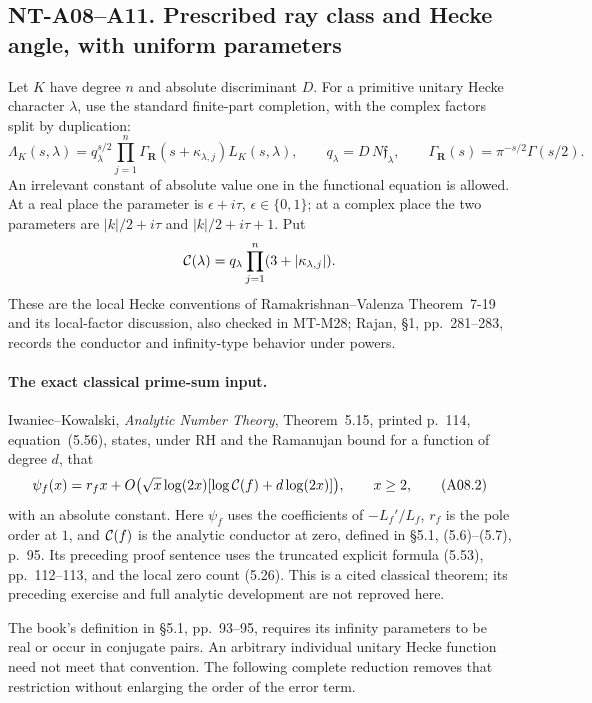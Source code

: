 \subsection*{NT-A08--A11. Prescribed ray class and Hecke angle, with uniform parameters}

Let \(K\) have degree \(n\) and absolute discriminant \(D\).
For a primitive unitary Hecke character \(\lambda\), use the standard
finite-part completion, with the complex factors split by duplication:
\[
 \Lambda_K(s,\lambda)=
 q_\lambda^{s/2}\prod_{j=1}^{n}\Gamma_{\mathbf R}(s+\kappa_{\lambda,j})
 L_K(s,\lambda),\qquad
 q_\lambda=D\,N\mathfrak f_\lambda,\qquad
 \Gamma_{\mathbf R}(s)=\pi^{-s/2}\Gamma(s/2).
                                                        \tag{A08.1}
\]
An irrelevant constant of absolute value one in the functional equation
is allowed. At a real place the parameter is
\(\epsilon+i\tau\), \(\epsilon\in\{0,1\}\); at a complex place the
two parameters are \(|k|/2+i\tau\) and \(|k|/2+i\tau+1\).
Put
\[
 {\cal C}(\lambda)=q_\lambda
                    \prod_{j=1}^{n}(3+|\kappa_{\lambda,j}|).
\]
These are the local Hecke conventions of Ramakrishnan--Valenza
Theorem~7-19 and its local-factor discussion, also checked in
MT-M28; Rajan, \S1, pp.~281--283, records the conductor and
infinity-type behavior under powers.

\paragraph{The exact classical prime-sum input.}
Iwaniec--Kowalski, \emph{Analytic Number Theory}, Theorem~5.15,
printed p.~114, equation~(5.56), states, under RH and the
Ramanujan bound for a function of degree \(d\), that
\[
 \psi_f(x)=r_fx+
 O\bigl(\sqrt x\log(2x)
             [\log{\cal C}(f)+d\log(2x)]\bigr),\qquad x\ge2,
                                                        \tag{A08.2}
\]
with an absolute constant. Here \(\psi_f\) uses the coefficients
of \(-L_f'/L_f\), \(r_f\) is the pole order at \(1\), and
\({\cal C}(f)\) is the analytic conductor at zero, defined in
\S5.1, (5.6)--(5.7), p.~95.
Its preceding proof sentence uses the truncated explicit formula
(5.53), pp.~112--113, and the local zero count (5.26).
This is a cited classical theorem; its preceding exercise and
full analytic development are not reproved here.

The book's definition in \S5.1, pp.~93--95, requires its infinity
parameters to be real or occur in conjugate pairs. An arbitrary
individual unitary Hecke function need not meet that convention.
The following complete reduction removes that restriction without
enlarging the order of the error term.

